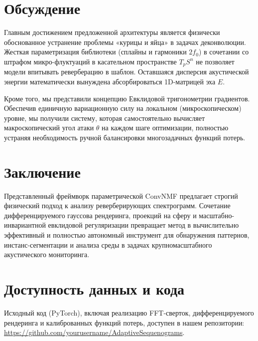 \documentclass[11pt,a4paper]{article}
\begin{document}
\section{Обсуждение}
Главным достижением предложенной архитектуры является физически обоснованное устранение проблемы «курицы и яйца» в задачах деконволюции. Жесткая параметризация библиотеки (сплайны и гармоники $2f_0$) в сочетании со штрафом микро-флуктуаций в касательном пространстве $T_p S^n$ не позволяет модели впитывать реверберацию в шаблон. Оставшаяся дисперсия акустической энергии математически вынуждена абсорбироваться 1D-матрицей эха $E$.

Кроме того, мы представили концепцию Евклидовой тригонометрии градиентов. Обеспечив единичную вариационную силу на локальном (микроскопическом) уровне, мы получили систему, которая самостоятельно вычисляет макроскопический угол атаки $\theta$ на каждом шаге оптимизации, полностью устраняя необходимость ручной балансировки многозадачных функций потерь.

\section{Заключение}
Представленный фреймворк параметрической ConvNMF предлагает строгий физический подход к анализу реверберирующих спектрограмм. Сочетание дифференцируемого гауссова рендеринга, проекций на сферу и масштабно-инвариантной евклидовой регуляризации превращает метод в вычислительно эффективный и полностью автономный инструмент для обнаружения паттернов, инстанс-сегментации и анализа среды в задачах крупномасштабного акустического мониторинга.

\section*{Доступность данных и кода}
Исходный код (PyTorch), включая реализацию FFT-сверток, дифференцируемого рендеринга и калиброванных функций потерь, доступен в нашем репозитории: \url{https://github.com/yourusername/AdaptiveSequenograms}.



\end{document}

